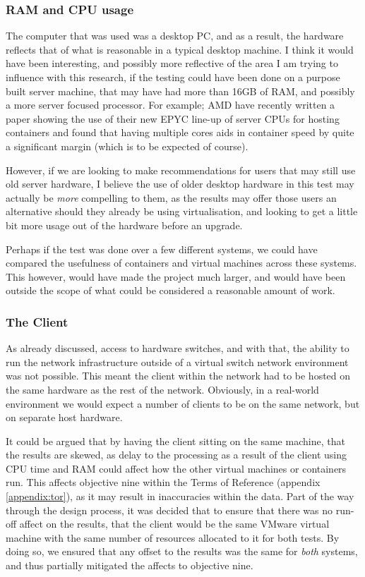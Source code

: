 \subsubsection{RAM and CPU usage}
\label{RAMCPU}
The computer that was used was a desktop PC, and as a result, the hardware reflects that of what is reasonable in a typical desktop machine. I think it would have been interesting, and possibly more reflective of the area I am trying to influence with this research, if the testing could have been done on a purpose built server machine, that may have had more than 16GB of RAM, and possibly a more server focused processor. For example; AMD have recently written a paper showing the use of their new EPYC line-up of server CPUs for hosting containers \citep{amdcontainers} and found that having multiple cores aids in container speed by quite a significant margin (which is to be expected of course).

However, if we are looking to make recommendations for users that may still use old server hardware, I believe the use of older desktop hardware in this test may actually be \emph{more} compelling to them, as the results may offer those users an alternative should they already be using virtualisation, and looking to get a little bit more usage out of the hardware before an upgrade.

Perhaps if the test was done over a few different systems, we could have compared the usefulness of containers and virtual machines across these systems. This however, would have made the project much larger, and would have been outside the scope of what could be considered a reasonable amount of work.

\subsubsection{The Client}
\label{ClientHardwareLimitation}
As already discussed, access to hardware switches, and with that, the ability to run the network infrastructure outside of a virtual switch network environment was not possible. This meant the client within the network had to be hosted on the same hardware as the rest of the network. Obviously, in a real-world environment we would expect a number of clients to be on the same network, but on separate host hardware.

It could be argued that by having the client sitting on the same machine, that the results are skewed, as delay to the processing as a result of the client using CPU time and RAM could affect how the other virtual machines or containers run. This affects objective nine within the Terms of Reference (appendix \ref{appendix:tor}), as it may result in inaccuracies within the data. Part of the way through the design process, it was decided that to ensure that there was no run-off affect on the results, that the client would be the same VMware virtual machine with the same number of resources allocated to it for both tests. By doing so, we ensured that any offset to the results was the same for \emph{both} systems, and thus partially mitigated the affects to objective nine.

